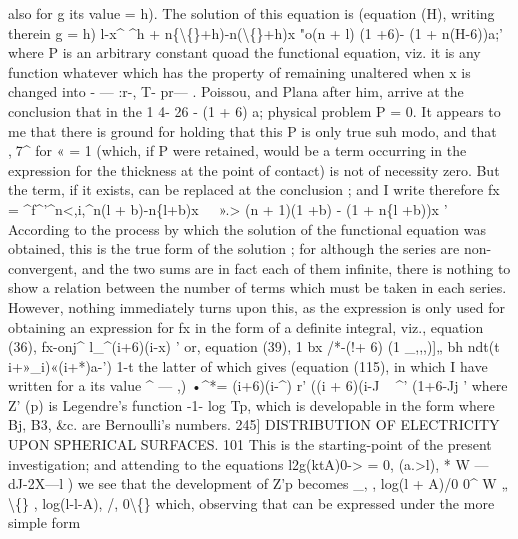 \documentclass[11pt,a4paper]{book}
\begin{document}
also  for  g  its  value  =  h).  The  solution  of  this  equation  is  (equation  (H),  writing  therein
g  =  h)
l-x^        ^h  +  n\{\textbackslash\{\}+h)-n(\textbackslash\{\}+h)x  "o(n  +  l)  (1 +6)- (1 +  n(H-6))a;'
where  P  is  an  arbitrary  constant  quoad  the  functional  equation,  viz.  it  is  any  function
whatever    which    has    the    property    of    remaining    unaltered    when    x    is    changed    into
- — :r-,  T-   pr— .     Poissou,   and   Plana   after   him,   arrive   at   the   conclusion   that   in   the
1  4-  26  -  (1  +  6)  a;
physical   problem   P  =  0.     It    appears  to   me   that   there   is  ground  for  holding  that  this
P
is   only  true   suh  modo,   and   that   ,^^^7^  for  « =  1    (which,   if  P  were  retained,   would
be  a  term  occurring  in  the  expression  for  the  thickness  at  the  point  of  contact)  is
not  of  necessity  zero.  But  the  term,  if  it  exists,  can  be  replaced  at  the  conclusion ;
and  I  write  therefore
fx  =  ^f^'^n<,i,^n(l  +  b)-n\{l+b)x  ~  ^^^».> (n  +  1)(1  +b) - (1  +  n\{l  +b))x '
According  to  the  process  by  which  the  solution  of  the  functional  equation  was
obtained,  this  is  the  true  form  of  the  solution ;  for  although  the  series  are  non-convergent,
and  the  two  sums  are  in  fact  each  of  them  infinite,  there  is  nothing  to  show  a  relation
between  the  number  of  terms  which  must  be  taken  in  each  series.  However,  nothing
immediately  turns  upon  this,  as  the  expression  is  only  used  for  obtaining  an  expression
for  fx  in  the  form  of  a  definite  integral,  viz.,  equation  (36),
fx-onj^    l_^(i+6)(i-x)     '
or,  equation   (39),
1  bx
/*-(!+ 6)  (1  _,,,)]„
bh  ndt(t  i+»_i)«(i+*)a-')
1-t
the  latter  of  which  gives  (equation  (115),  in  which  I  have  written  for  a  its  value  ^ — ,)
•^*=  (i+6)(i-^)  r'  ((i  +  6)(i-J  ~  ^'  (1+6-Jj '
where  Z'  (p)  is  Legendre's  function  -1-  log  Tp,  which  is  developable  in  the  form
where  Bj,  B3,  \&c.  are  Bernoulli's  numbers.
245]  DISTRIBUTION    OF    ELECTRICITY   UPON    SPHERICAL    SURFACES.  101
This    is    the    starting-point    of    the    present    investigation;    and    attending    to    the
equations
l2g(ktA)0->  =  0,  (a.>l),
*  W  —  dJ-2X—l )
we  see  that  the  development  of  Z'p  becomes
_,       ,  log(l  +  A)/0      0^       W       „    \textbackslash\{\}     ,  log(l-l-A),      /,      0\textbackslash\{\}
which,  observing   that
can  be    expressed   under   the   more   simple   form
\end{document}
